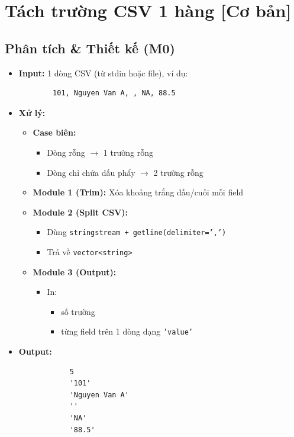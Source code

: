 \section{Tách trường CSV 1 hàng [Cơ bản]}
\subsection{Phân tích \& Thiết kế (M0)}
    \begin{itemize}
        \item \textbf{Input:} 
        1 dòng CSV (từ stdin hoặc file), ví dụ:
        
        \begin{lstlisting}
        101, Nguyen Van A, , NA, 88.5
        \end{lstlisting}

        \item \textbf{Xử lý:}
        \begin{itemize}
            \item \textbf{Case biên:} 
            \begin{itemize}
                \item Dòng rỗng $\rightarrow$ 1 trường rỗng
                \item Dòng chỉ chứa dấu phẩy $\rightarrow$ 2 trường rỗng
            \end{itemize}
            \item \textbf{Module 1 (Trim):} Xóa khoảng trắng đầu/cuối mỗi field
            \item \textbf{Module 2 (Split CSV):}
            \begin{itemize}
            \item Dùng \texttt{stringstream + getline(delimiter=',')}
            \item Trả về \texttt{vector<string>}
            \end{itemize}
                \item \textbf{Module 3 (Output):}
            \begin{itemize}
                \item In:
                \begin{itemize}
                    \item số trường
                    \item từng field trên 1 dòng dạng \texttt{'value'}
                \end{itemize}
            \end{itemize}
        \end{itemize}
        \item \textbf{Output:}
        \begin{lstlisting}
            5
            '101'
            'Nguyen Van A'
            ''
            'NA'
            '88.5'\end{lstlisting}
    \end{itemize}

